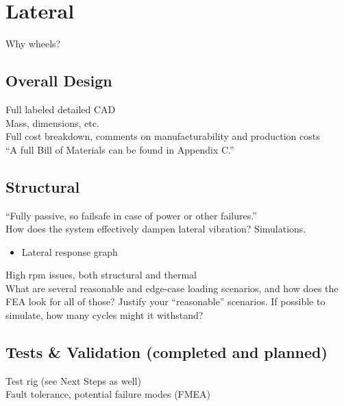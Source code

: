 \documentclass[main.tex]{subfiles}
\begin{document}
    \section{Lateral}
    Why wheels?

    \subsection{Overall Design}
    Full labeled detailed CAD\\
    Mass, dimensions, etc.\\
    Full cost breakdown, comments on manufacturability and production costs\\
    “A full Bill of Materials can be found in Appendix C.”

    \subsection{Structural}
    “Fully passive, so failsafe in case of power or other failures.”\\
    How does the system effectively dampen lateral vibration? Simulations.\\
    \begin{itemize}
        \item Lateral response graph
    \end{itemize}
    High rpm issues, both structural and thermal\\
    What are several reasonable and edge-case loading scenarios, and how does the FEA look for all of those? Justify your “reasonable” scenarios. If possible to simulate, how many cycles might it withstand?

    \subsection{Tests \& Validation (completed and planned)}
    Test rig (see Next Steps as well)\\
    Fault tolerance, potential failure modes (FMEA)
\end{document}
